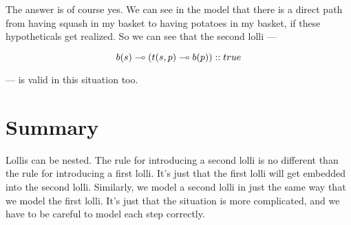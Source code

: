 \documentclass[../../../main.tex]{subfiles}
\begin{document}
The answer is of course yes. We can see in the model that there is a direct path from having squash in my basket to having potatoes in my basket, if these hypotheticals get realized. So we can see that the second lolli ---

\begin{equation*}
  b(s) \lolli/ (t(s, p) \lolli/ b(p)) :: true
\end{equation*}

\noindent
--- is valid in this situation too.



\section{Summary}

Lollis can be nested. The rule for introducing a second lolli is no different than the rule for introducing a first lolli. It's just that the first lolli will get embedded into the second lolli. Similarly, we model a second lolli in just the same way that we model the first lolli. It's just that the situation is more complicated, and we have to be careful to model each step correctly.
\end{document}
